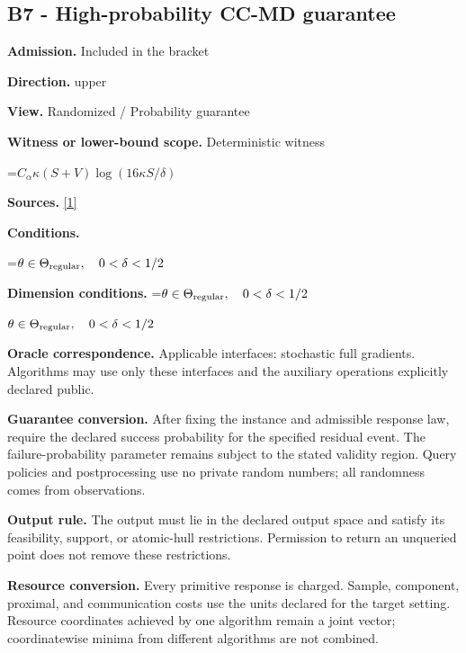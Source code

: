 \documentclass[10pt,a4paper]{article}
\newcommand{\AtlasMath}[1]{\par\begingroup\centering\setbox0=\hbox{$\displaystyle #1$}\ifdim\wd0>1.4\linewidth\typeout{ATLAS WIDE FORMULA: \the\wd0}\fi\ifdim\wd0>\linewidth\resizebox{\linewidth}{!}{\box0}\else\box0\fi\par\endgroup}
\newcommand{\AtlasInlineMath}[1]{\begingroup\setbox0=\hbox{$#1$}\ifdim\wd0>.4\linewidth\endgroup\AtlasMath{#1}\else\endgroup$#1$\fi}
\begin{document}
\subsection{B7 - High-probability CC-MD guarantee}


\textbf{Admission.} Included in the bracket



\textbf{Direction.} upper



\textbf{View.} Randomized / Probability guarantee



\textbf{Witness or lower-bound scope.} Deterministic witness



\AtlasMath{C_\alpha\kappa(S+V)\log(16\kappa S/\delta)}


\textbf{Sources.} \href{https://arxiv.org/pdf/2609.03990}{[1]}



\textbf{Conditions.}
\AtlasMath{\theta\in\Theta_{\rm regular},\quad0<\delta<1/2}




\textbf{Dimension conditions.} \AtlasInlineMath{\theta\in\Theta_{\rm regular},\quad0<\delta<1/2}



\textbf{Oracle correspondence.} Applicable interfaces: stochastic full gradients. Algorithms may use only these interfaces and the auxiliary operations explicitly declared public.



\textbf{Guarantee conversion.} After fixing the instance and admissible response law, require the declared success probability for the specified residual event. The failure-probability parameter remains subject to the stated validity region. Query policies and postprocessing use no private random numbers; all randomness comes from observations.



\textbf{Output rule.} The output must lie in the declared output space and satisfy its feasibility, support, or atomic-hull restrictions. Permission to return an unqueried point does not remove these restrictions.



\textbf{Resource conversion.} Every primitive response is charged. Sample, component, proximal, and communication costs use the units declared for the target setting. Resource coordinates achieved by one algorithm remain a joint vector; coordinatewise minima from different algorithms are not combined.
\end{document}
